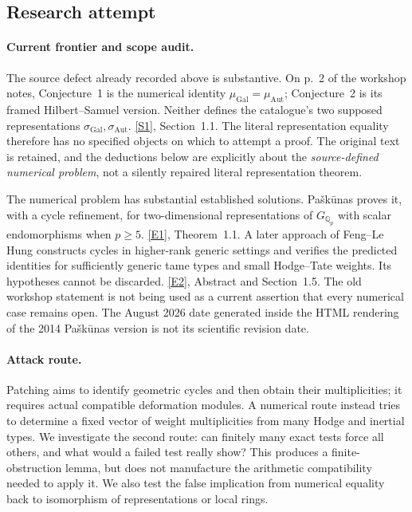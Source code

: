 \documentclass[11pt,a4paper]{article}
\newcommand{\Q}{\mathbb{Q}}
\newcommand{\sref}[2]{\hyperlink{source:#1:#2}{[S#2]}}
\newcommand{\eref}[2]{\hyperlink{extra:#1:#2}{[E#2]}}
\numberwithin{equation}{section}
\begin{document}
\subsection{Research attempt}

\paragraph{Current frontier and scope audit.}
The source defect already recorded above is substantive. On p.~2 of the
workshop notes, Conjecture~1 is the numerical identity
$\mu_{\mathrm{Gal}}=\mu_{\mathrm{Aut}}$; Conjecture~2 is its framed
Hilbert--Samuel version. Neither defines the catalogue's two supposed
representations $\sigma_{\mathrm{Gal}},\sigma_{\mathrm{Aut}}$.
\sref{30006981}{1}, Section~1.1. The literal representation equality therefore
has no specified objects on which to attempt a proof. The original text
is retained, and the deductions below are explicitly about the
\emph{source-defined numerical problem}, not a silently repaired literal
representation theorem.

The numerical problem has substantial established solutions. Pa\v{s}k\=unas
proves it, with a cycle refinement, for two-dimensional representations
of $G_{\Q_p}$ with scalar endomorphisms when $p\ge5$.
\eref{30006981}{1}, Theorem~1.1. A later approach of Feng--Le Hung constructs
cycles in higher-rank generic settings and verifies the predicted
identities for sufficiently generic tame types and small Hodge--Tate
weights. Its hypotheses cannot be discarded. \eref{30006981}{2}, Abstract
and Section~1.5. The old workshop statement is not being used as a
current assertion that every numerical case remains open. The August
2026 date generated inside the HTML rendering of the 2014 Pa\v{s}k\=unas
version is not its scientific revision date.

\paragraph{Attack route.}
Patching aims to identify geometric cycles and then obtain their
multiplicities; it requires actual compatible deformation modules.
A numerical route instead tries to determine a fixed vector of weight
multiplicities from many Hodge and inertial types. We investigate the
second route: can finitely many exact tests force all others, and what
would a failed test really show? This produces a finite-obstruction
lemma, but does not manufacture the arithmetic compatibility needed to
apply it. We also test the false implication from numerical equality
back to isomorphism of representations or local rings.
\end{document}
